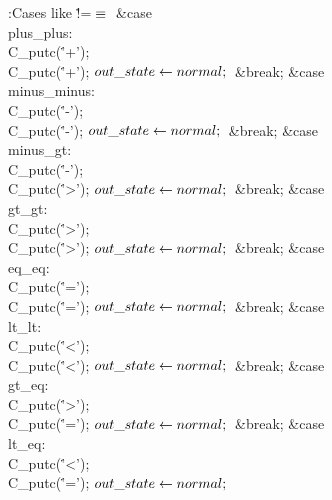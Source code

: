 \B{}:Cases like \.{!=}\X${}\equiv{}$\6
\4\hbox{\1\quad}\&{case} \\{plus\_plus}:\5
\\{C\_putc}(\.{'+'});\5
\\{C\_putc}(\.{'+'});\6
${}\\{out\_state}\leftarrow\\{normal};{}$\6
\&{break};\6
\4\&{case} \\{minus\_minus}:\5
\\{C\_putc}(\.{'-'});\5
\\{C\_putc}(\.{'-'});\6
${}\\{out\_state}\leftarrow\\{normal};{}$\6
\&{break};\6
\4\&{case} \\{minus\_gt}:\5
\\{C\_putc}(\.{'-'});\5
\\{C\_putc}(\.{'>'});\6
${}\\{out\_state}\leftarrow\\{normal};{}$\6
\&{break};\6
\4\&{case} \\{gt\_gt}:\5
\\{C\_putc}(\.{'>'});\5
\\{C\_putc}(\.{'>'});\6
${}\\{out\_state}\leftarrow\\{normal};{}$\6
\&{break};\6
\4\&{case} \\{eq\_eq}:\5
\\{C\_putc}(\.{'='});\5
\\{C\_putc}(\.{'='});\6
${}\\{out\_state}\leftarrow\\{normal};{}$\6
\&{break};\6
\4\&{case} \\{lt\_lt}:\5
\\{C\_putc}(\.{'<'});\5
\\{C\_putc}(\.{'<'});\6
${}\\{out\_state}\leftarrow\\{normal};{}$\6
\&{break};\6
\4\&{case} \\{gt\_eq}:\5
\\{C\_putc}(\.{'>'});\5
\\{C\_putc}(\.{'='});\6
${}\\{out\_state}\leftarrow\\{normal};{}$\6
\&{break};\6
\4\&{case} \\{lt\_eq}:\5
\\{C\_putc}(\.{'<'});\5
\\{C\_putc}(\.{'='});\6
${}\\{out\_state}\leftarrow\\{normal};{}$\6
